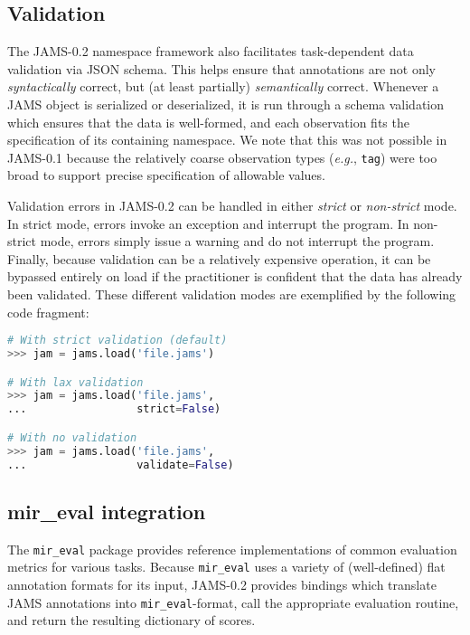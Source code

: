 \documentclass{article}
\begin{document}
\subsection{Validation}\label{sec:imp:validation}
The JAMS-0.2 namespace framework also facilitates task-dependent data validation via 
JSON schema.
This helps ensure that annotations are not only \emph{syntactically} correct, but (at
least partially) \emph{semantically} correct.
Whenever a JAMS object is serialized or deserialized, it is run through a schema
validation which ensures that the data is well-formed, and each observation fits the
specification of its containing namespace.  We note that this was not possible in
JAMS-0.1 because the relatively coarse observation types (\emph{e.g.}, \texttt{tag}) were
too broad to support precise specification of allowable values.

Validation errors in JAMS-0.2 can be handled in either \emph{strict} or \emph{non-strict}
mode.  In strict mode, errors invoke an exception and interrupt the program.  In
non-strict mode, errors simply issue a warning and do not interrupt the program.
Finally, because validation can be a relatively expensive operation, it can be bypassed
entirely on load if the practitioner is confident that the data has already been
validated.  These different validation modes are exemplified by the following code
fragment:

\begin{lstlisting}[language=python]
# With strict validation (default)
>>> jam = jams.load('file.jams')

# With lax validation
>>> jam = jams.load('file.jams',
...                 strict=False)

# With no validation
>>> jam = jams.load('file.jams',
...                 validate=False)
\end{lstlisting}


\subsection{mir\_eval integration}\label{sec:imp:mireval}
The \texttt{mir\_eval} package provides reference implementations of common evaluation
metrics for various tasks.
Because \texttt{mir\_eval} uses a variety of (well-defined) flat annotation formats for
its input, JAMS-0.2 provides bindings which translate JAMS annotations into
\texttt{mir\_eval}-format, call the appropriate evaluation routine, and return the
resulting dictionary of scores.
\end{document}
